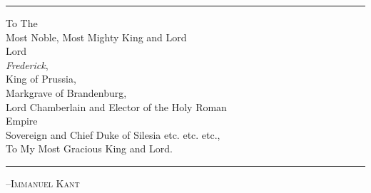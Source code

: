 
\mbox{}
\hrule

\vspace{1in}


\begin{centering}
	\large{To The} \\
	\Large{Most Noble, Most Mighty King and Lord \\ 
				 Lord
				 } \\
	\huge{\textit{Frederick},} \\
	\Large{King of Prussia, \\ 
				 Markgrave of Brandenburg, \\
	       Lord Chamberlain and Elector of the Holy Roman \\ 
				 Empire \\
	       Sovereign and Chief Duke of Silesia etc. etc. etc., \\
				 To My Most Gracious King and Lord.\\
				 }
\end{centering}
\vspace{1in}
\hrule

\begin{flushright}
	{\scshape {--Immanuel Kant}}
\end{flushright}
	
\vfill


















\textwidth 5.750in \textheight=8.50in \headheight 0.0625in \topmargin 0.0in %
